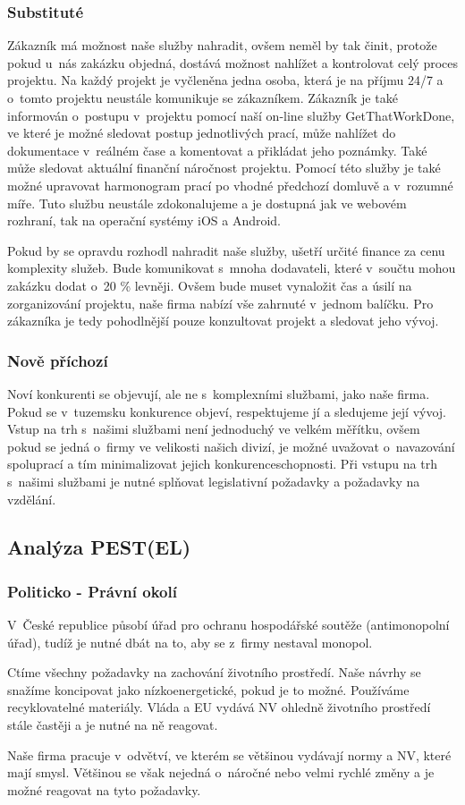 \documentclass[a4paper, twoside, 11pt]{article}
\begin{document}
		\subsubsection{Substituté}
		Zákazník má možnost naše služby nahradit, ovšem neměl by tak činit, protože pokud u~nás zakázku objedná, dostává možnost nahlížet a kontrolovat celý proces projektu. Na každý projekt je vyčleněna jedna osoba, která je na příjmu 24/7 a o~tomto projektu neustále komunikuje se zákazníkem. Zákazník je také informován o~postupu v~projektu pomocí naší on-line služby GetThatWorkDone, ve které je možné sledovat postup jednotlivých prací, může nahlížet do dokumentace v~reálném čase a komentovat a přikládat jeho poznámky. Také může sledovat aktuální finanční náročnost projektu. Pomocí této služby je také možné upravovat harmonogram prací po vhodné předchozí domluvě a v~rozumné míře. Tuto službu neustále zdokonalujeme a je dostupná jak ve webovém rozhraní, tak na operační systémy iOS a Android.
\par Pokud by se opravdu rozhodl nahradit naše služby, ušetří určité finance za cenu komplexity služeb. Bude komunikovat s~mnoha dodavateli, které v~součtu mohou zakázku dodat o~20 \% levněji. Ovšem bude muset vynaložit čas a úsilí na zorganizování projektu, naše firma nabízí vše zahrnuté v~jednom balíčku. Pro zákazníka je tedy pohodlnější pouze konzultovat projekt a sledovat jeho vývoj.

		\subsubsection{Nově příchozí}
		Noví konkurenti se objevují, ale ne s~komplexními službami, jako naše firma. Pokud se v~tuzemsku konkurence objeví, respektujeme jí a sledujeme její vývoj. Vstup na trh s~našimi službami není jednoduchý ve velkém měřítku, ovšem pokud se jedná o~firmy ve velikosti našich divizí, je možné uvažovat o~navazování spoluprací a tím minimalizovat jejich konkurenceschopnosti.
Při vstupu na trh s~našimi službami je nutné splňovat legislativní požadavky a požadavky na vzdělání. 

	\subsection{Analýza PEST(EL)}
			\subsubsection{Politicko - Právní okolí}
				V~České republice působí úřad pro ochranu hospodářské soutěže (antimonopolní úřad), tudíž je nutné dbát na to, aby se z~firmy nestaval monopol. \par
				Ctíme všechny požadavky na zachování životního prostředí. Naše návrhy se snažíme koncipovat jako nízkoenergetické, pokud je to možné. Používáme recyklovatelné materiály. Vláda a EU vydává NV ohledně životního prostředí stále častěji a je nutné na ně reagovat.\par
Naše firma pracuje v~odvětví, ve kterém se většinou vydávají normy a NV, které mají smysl. Většinou se však nejedná o~náročné nebo velmi rychlé změny a je možné reagovat na tyto požadavky.
\end{document}
